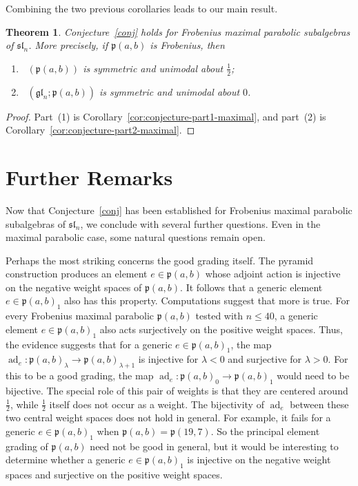 \documentclass{amsart}
\def\fp{\mathfrak p} %
\def\sl{\mathfrak{sl}}
\def\gl{\mathfrak{gl}}
\newcommand{\pab}[1][a,b]{\fp(#1)}
\def\sln{\sl_n}
\def\gln{\gl_n}
\def\dimvec{\mathop{\underline{\mathrm{dim}}}}
\def\ad{\operatorname{ad}}
\newtheorem{theorem}{Theorem}%
\theoremstyle{definition}
\begin{document}
Combining the two previous corollaries leads to our main result.
\begin{theorem}
\label{th:main-maximal}
Conjecture~\ref{conj} holds for Frobenius maximal parabolic
subalgebras of $\sln$. More precisely, if $\pab$ is Frobenius, then
\begin{enumerate}
    \item $\dimvec(\pab)$ is symmetric and unimodal about $\frac12$;
    \item $\dimvec(\gln;\pab)$ is symmetric and unimodal about $0$.
\end{enumerate}
\end{theorem}

\begin{proof}
Part~{\rm (1)} is Corollary~\ref{cor:conjecture-part1-maximal}, and
part~{\rm (2)} is Corollary~\ref{cor:conjecture-part2-maximal}.
\end{proof}


\section{Further Remarks}
\label{sec:further remarks}


Now that Conjecture~\ref{conj} has been established for Frobenius maximal
parabolic subalgebras of $\sln$, we conclude with several further
questions. Even in the maximal parabolic case, some natural questions
remain open.

Perhaps the most striking concerns the good grading itself. The pyramid
construction produces an element $e\in\pab$ whose adjoint action is
injective on the negative weight spaces of $\pab$. It follows that a generic element
$e\in\pab_1$ also has this property. Computations suggest that more is true. For every Frobenius maximal
parabolic $\pab$ tested with $n\leq 40$, a generic element
$e\in\pab_1$ also acts surjectively on the positive weight spaces. Thus, the evidence suggests that for a generic $e\in \pab_1$, the map $\operatorname{ad}_e: \pab_{\lambda} \rightarrow \pab_{\lambda+1}$ is injective for $\lambda <0$ and surjective for $\lambda >0$. For this to be a good grading, the map $\ad_e:\pab_0\longrightarrow\pab_1$ would need to be bijective. The special role of this pair of weights is that they are centered around $\frac{1}{2}$, while $\frac{1}{2}$ itself does not occur as a weight. The bijectivity of $\ad_e$ between these two central weight spaces does not hold in general. For example, it fails for a generic $e\in \pab_1$ when $\pab = \mathfrak{p}(19,7)$. So the principal element grading of $\pab$ need not be good in general, but it would be interesting to determine whether a generic $e\in \pab_1$ is injective on the negative weight spaces and
surjective on the positive weight spaces.
\end{document}

